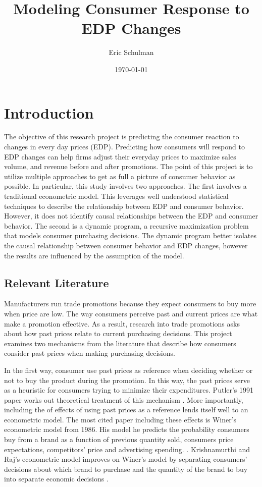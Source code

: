 \documentclass{article}
\title{Modeling Consumer Response to EDP Changes}
\author{Eric Schulman}
\date{\today}
\begin{document}
\maketitle

\section{Introduction}

The objective of this research project is predicting the consumer reaction to changes in every day prices (EDP). Predicting how consumers will respond to EDP changes can help firms adjust their everyday prices to maximize sales volume, and revenue before and after promotions. The point of this project is to utilize multiple approaches to get as full a picture of consumer behavior as possible. In particular, this study involves two approaches. The first involves a traditional econometric model. This leverages well understood statistical techniques to describe the relationship between EDP and consumer behavior. However, it does not identify causal relationships between the EDP and consumer behavior. The second is a dynamic program, a recursive maximization problem that models consumer purchasing decisions. The dynamic program better isolates the causal relationship between consumer behavior and EDP changes, however the results are influenced by the assumption of the model.

\subsection{Relevant Literature}

Manufacturers run trade promotions because they expect consumers to buy more when price are low. The way consumers perceive past and current prices are what make a promotion effective. As a result, research into trade promotions asks about how past prices relate to current purchasing decisions.  This project examines two mechanisms from the literature that describe how consumers consider past prices when making purchasing decisions.

In the first way, consumer use past prices as reference when deciding whether or not to buy the product during the promotion. In this way, the past prices serve as a heuristic for consumers trying to minimize their expenditures. Putler's 1991 paper works out theoretical treatment of this mechanism \cite{putler}. More importantly, including the of effects of using past prices as a reference lends itself well to an econometric model. The most cited paper including these effects is Winer's econometric model from 1986. His model he predicts the probability consumers buy from a brand as a function of previous quantity sold, consumers price expectations, competitors' price and advertising spending.  \cite{winer}. Krishnamurthi and Raj's econometric model improves on Winer's model by separating consumers' decisions about which brand to purchase and the quantity of the brand to buy into separate economic decisions \cite{krishnamurthi}.
\end{document}
